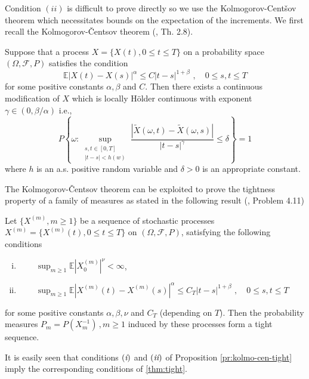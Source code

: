 Condition $ (ii) $ is difficult to prove directly so we use the Kolmogorov-Cent\v sov theorem 
which necessitates bounds on the expectation of the increments. 
%
%
%
We first recall the Kolmogorov-\v Centsov theorem (\cite{karatzas2014brownian}, Th. 2.8).
\begin{theorem}\label{thm:kolmo-cen}
Suppose that a process $ X = \{X(t), 0 \leq t \leq T \} $ on a probability space $ (\Omega, \mathscr F, P) $ satisfies the condition 
\begin{equation}\label{eq:kolmo-cen-cond}
\mathbb E | X(t) - X(s) | ^\alpha \leq C | t-s|^{1 + \beta} \,\,,\quad 0 \leq s,t \leq T
\end{equation}
for some positive constants $ \alpha, \beta $ and $ C $. Then there exists a continuous modification of $ X $ which is locally H\"older continuous 
with exponent $ \gamma \in (0, \beta / \alpha) $ i.e., 
\begin{equation}
P\left\{  \omega : \sup_{ \substack{  s,t \in [0,T] \\ |t-s| < h(w)} }
\frac{  | \tilde X(\omega, t)    -   \tilde X(\omega, s)  |}{|t-s|^\gamma}  
\leq \delta 
\right\} = 1
\end{equation}
where $ h $ is an a.s. positive random variable and $ \delta > 0 $ is an appropriate constant. 
\end{theorem} 
%
%
%
%
%
The  Kolmogorov-\v Centsov theorem can be exploited to prove the tightness property of a family of measures as 
stated in the following result (\cite{karatzas2014brownian}, Problem 4.11) 
%
%
%
\begin{prop}\label{pr:kolmo-cen-tight}
	Let $ \{ X^{(m)}, m\geq 1 \} $ be a sequence of stochastic processes $ X^{(m)} = \{X^{(m)}(t), 0 \leq t \leq T \} $
	on $ (\Omega, \mathscr F, P) $, satisfying the following conditions
	\begin{enumerate}[(i)]
		\item  $ \qquad  \sup_{m \geq 1 } \mathbb E |X_0^{(m)}|^\nu < \infty $, 
		\item  $ \qquad \sup_{m \geq 1 }  \mathbb E | X^{(m)}(t) - X^{(m)}(s) | ^\alpha \leq C_T | t-s|^{1 + \beta} \,\,,\quad 0 \leq s,t \leq T $
	\end{enumerate}
for some positive constants $ \alpha, \beta, \nu $ and $ C_T $ (depending on $ T $). Then the probability measures 
$ P_m = P(X_m^{-1}) \,, m\geq 1$  induced by these processes form a tight sequence. 
\end{prop}
It is easily seen that conditions $ (\emph{i}) $  and $ (\emph{ii}) $ of Proposition \autoref{pr:kolmo-cen-tight} imply the 
corresponding conditions of \autoref{thm:tight}. 
%
%

